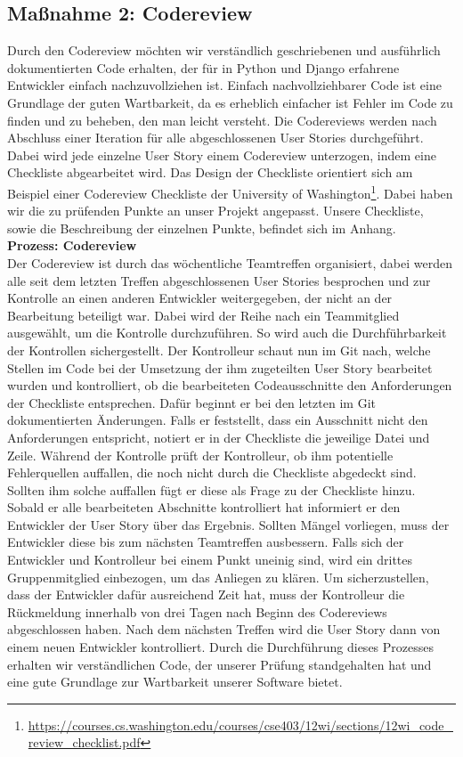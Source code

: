 \documentclass[accentcolor=tud0b,12pt,paper=a4]{tudreport}
\begin{document}
\subsection{Maßnahme 2: Codereview}
Durch den Codereview möchten wir verständlich geschriebenen und ausführlich dokumentierten Code erhalten, der für in Python und Django erfahrene Entwickler einfach nachzuvollziehen ist. Einfach nachvollziehbarer Code ist eine Grundlage der guten Wartbarkeit, da es erheblich einfacher ist Fehler im Code zu finden und zu beheben, den man leicht versteht.
Die Codereviews werden nach Abschluss einer Iteration für alle abgeschlossenen User Stories durchgeführt. Dabei wird jede einzelne User Story einem Codereview unterzogen, indem eine Checkliste abgearbeitet wird. Das Design der Checkliste orientiert sich am Beispiel einer Codereview Checkliste der University of Washington\footnote{\url{https://courses.cs.washington.edu/courses/cse403/12wi/sections/12wi_code_review_checklist.pdf}}. Dabei haben wir die zu prüfenden Punkte an unser Projekt angepasst. Unsere Checkliste, sowie die Beschreibung der einzelnen Punkte, befindet sich im Anhang.\\


\noindent \textbf{Prozess: Codereview}\\
Der Codereview ist durch das wöchentliche Teamtreffen organisiert, dabei werden alle seit dem letzten Treffen abgeschlossenen User Stories besprochen und zur Kontrolle an einen anderen Entwickler weitergegeben, der nicht an der Bearbeitung beteiligt war. Dabei wird der Reihe nach ein Teammitglied ausgewählt, um die Kontrolle durchzuführen. So wird auch die Durchführbarkeit der Kontrollen sichergestellt. Der Kontrolleur schaut nun im Git nach, welche Stellen im Code bei der Umsetzung der ihm zugeteilten User Story bearbeitet wurden und kontrolliert, ob die bearbeiteten Codeausschnitte den Anforderungen der Checkliste entsprechen. Dafür beginnt er bei den letzten im Git dokumentierten Änderungen. Falls er feststellt, dass ein Ausschnitt nicht den Anforderungen entspricht, notiert er in der Checkliste die jeweilige Datei und Zeile. Während der Kontrolle prüft der Kontrolleur, ob ihm potentielle Fehlerquellen auffallen, die noch nicht durch die Checkliste abgedeckt sind. Sollten ihm solche auffallen fügt er diese als Frage zu der Checkliste hinzu. Sobald er alle bearbeiteten Abschnitte kontrolliert hat informiert er den Entwickler der User Story über das Ergebnis. Sollten Mängel vorliegen, muss der Entwickler diese bis zum nächsten Teamtreffen ausbessern. Falls sich der Entwickler und Kontrolleur bei einem Punkt uneinig sind, wird ein drittes Gruppenmitglied einbezogen, um das Anliegen zu klären.
Um sicherzustellen, dass der Entwickler dafür ausreichend Zeit hat, muss der Kontrolleur die Rückmeldung innerhalb von drei Tagen nach Beginn des Codereviews abgeschlossen haben. Nach dem nächsten Treffen wird die User Story dann von einem neuen Entwickler kontrolliert.
Durch die Durchführung dieses Prozesses erhalten wir verständlichen Code, der unserer Prüfung standgehalten hat und eine gute Grundlage zur Wartbarkeit unserer Software bietet.        
	
\end{document}
